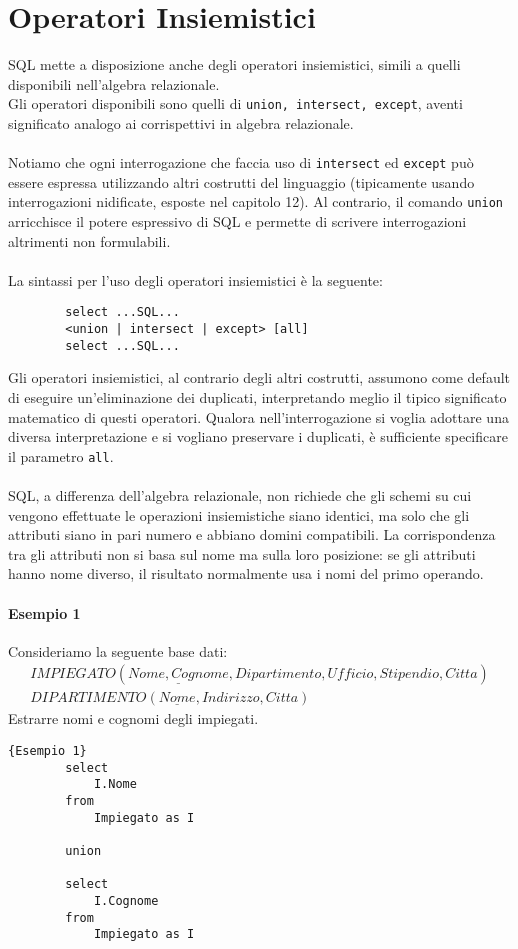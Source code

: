 \chapter{Operatori Insiemistici}

SQL mette a disposizione anche degli operatori insiemistici, simili a quelli disponibili nell'algebra relazionale.\\
Gli operatori disponibili sono quelli di  \texttt{union, intersect, except}, aventi significato analogo ai corrispettivi in algebra relazionale.\\\\
Notiamo che ogni interrogazione che faccia uso di \texttt{intersect} ed \texttt{except} può essere espressa utilizzando altri costrutti del linguaggio (tipicamente usando interrogazioni nidificate, esposte nel capitolo 12). Al contrario, il comando \texttt{union} arricchisce il potere espressivo di SQL e permette di scrivere interrogazioni altrimenti non formulabili.\\\\
La sintassi per l'uso degli operatori insiemistici è la seguente:
	\begin{lstlisting}
		select ...SQL...
		<union | intersect | except> [all]
		select ...SQL...	
	\end{lstlisting}
Gli operatori insiemistici, al contrario degli altri costrutti, assumono come default di eseguire un'eliminazione dei duplicati, interpretando meglio il tipico significato matematico di questi operatori. Qualora nell'interrogazione si voglia adottare una diversa interpretazione e si vogliano preservare i duplicati, è sufficiente specificare il parametro \texttt{all}.\\\\
SQL, a differenza dell'algebra relazionale, non richiede che gli schemi su cui vengono effettuate le operazioni insiemistiche siano identici, ma solo che gli attributi siano in pari numero e abbiano domini compatibili. La corrispondenza tra gli attributi non si basa sul nome ma sulla loro posizione: se gli attributi hanno nome diverso, il risultato normalmente usa i nomi del primo operando.

\subsubsection{Esempio 1}
Consideriamo la seguente base dati:
	\begin{equation}\begin{aligned}
		IMPIEGATO (\underline{Nome, Cognome}, Dipartimento, Ufficio, Stipendio, Citta)\\
		DIPARTIMENTO (\underline{Nome}, Indirizzo, Citta)
	\end{aligned}\end{equation}
Estrarre nomi e cognomi degli impiegati.
	\begin{lstlisting}{Esempio 1}
		select
			I.Nome
		from
			Impiegato as I
		
		union
		
		select
			I.Cognome
		from
			Impiegato as I
	\end{lstlisting}
	
